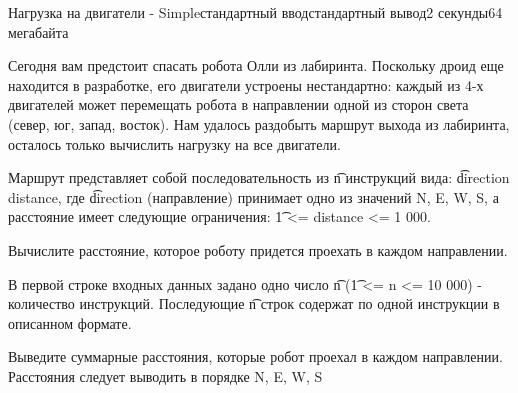 \begin{problem}{Нагрузка на двигатели - Simple}{стандартный ввод}{стандартный вывод}{2 секунды}{64 мегабайта}

Сегодня вам предстоит спасать робота Олли из лабиринта. Поскольку дроид еще находится в разработке, его двигатели устроены нестандартно: каждый из 4-х двигателей может перемещать робота в направлении одной из сторон света (север, юг, запад, восток). Нам удалось раздобыть маршрут выхода из лабиринта, осталось только вычислить нагрузку на все двигатели.


Маршрут представляет собой последовательность из \t{n} инструкций вида: \t{direction distance}, где \t{direction} (направление) принимает одно из значений {N, E, W, S}, а  расстояние имеет следующие ограничения:  \t{1 <= distance <= 1 000}.


Вычислите расстояние, которое роботу придется проехать в каждом направлении.


\InputFile
В первой строке входных данных задано одно число \t{n} (\t{1 <= n <= 10 000}) - количество инструкций. Последующие \t{n} строк содержат по одной инструкции в описанном формате.  


\OutputFile
Выведите суммарные расстояния, которые робот проехал в каждом направлении. Расстояния следует выводить в порядке {N, E, W, S}

\Examples

\begin{example}
%
%
\end{example}

\end{problem}

